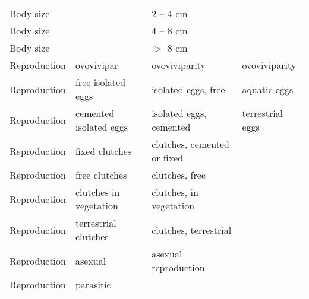 \documentclass[../Draft_harmonization_paper.tex]{subfiles}
\begin{document}
\begin{longtable}{llll}
    Body size &  & 2 – 4 cm &  \\ 
    Body size &  & 4 – 8 cm &  \\ 
    Body size &  & $>$ 8 cm &  \\ 
    \hline
    Reproduction & ovovivipar & ovoviviparity & ovoviviparity \\ 
    \rowcolor{purple!25}
    Reproduction & free isolated eggs & isolated eggs, free & aquatic eggs \\ 
    \cellcolor{purple!25}Reproduction & \cellcolor{purple!25}cemented isolated eggs & \cellcolor{purple!25}isolated eggs, cemented & terrestrial eggs \\
    \cellcolor{purple!25}Reproduction & \cellcolor{purple!25}fixed clutches & \cellcolor{purple!25}clutches, cemented or fixed &  \\ 
    \cellcolor{purple!25}Reproduction & \cellcolor{purple!25}free clutches & \cellcolor{purple!25}clutches, free &  \\ 
    \cellcolor{purple!25}Reproduction & \cellcolor{purple!25}clutches in vegetation & \cellcolor{purple!25}clutches, in vegetation &  \\ 
    Reproduction & terrestrial clutches & clutches, terrestrial &  \\ 
    \color{cyan}Reproduction & \color{cyan}asexual & \color{cyan}asexual reproduction &  \\ 
    \color{cyan}Reproduction & \color{cyan}parasitic &  &  \\ 
    \hline
\end{longtable}


\end{document}
